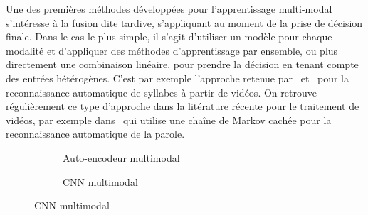 Une des premières méthodes développées pour l'apprentissage multi-modal s'intéresse à la fusion dite tardive, s'appliquant au moment de la prise de décision finale. Dans le cas le plus simple, il s'agit d'utiliser un modèle pour chaque modalité et d'appliquer des méthodes d'apprentissage par ensemble, ou plus directement une combinaison linéaire, pour prendre la décision en tenant compte des entrées hétérogènes. C'est par exemple l'approche retenue par~\citet{yuhas_integration_1989} et~\citet{meier_adaptive_1996} pour la reconnaissance automatique de syllabes à partir de vidéos. On retrouve régulièrement ce type d'approche dans la litérature récente pour le traitement de vidéos, par exemple dans~\cite{noda_audio-visual_2015} qui utilise une chaîne de Markov cachée pour la reconnaissance automatique de la parole.

\begin{figure}
  \hfill
  \begin{subfigure}[b]{0.43\textwidth}
    \resizebox{\textwidth}{!}{
      
    }
    \caption{Auto-encodeur multimodal~\cite{ngiam_multimodal_2011}}
    \label{fig:ae_multimodal}
  \end{subfigure}%
  \hfill
  \begin{subfigure}[b]{0.53\textwidth}
    \resizebox{\textwidth}{!}{
      
    }
    \caption{\gls{CNN} multimodal~\cite{eitel_multimodal_2015}}
    \label{fig:cnn_multimodal}
  \end{subfigure}
  \hfill
\end{figure}

